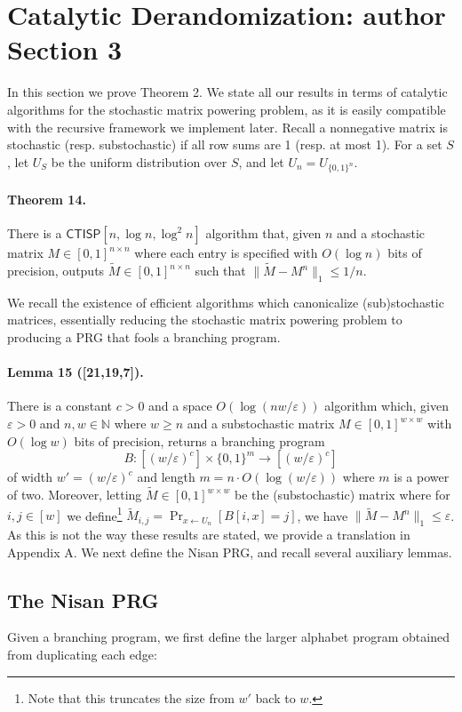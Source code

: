 \documentclass[10pt,a4paper]{article}
\begin{document}
\section*{Catalytic Derandomization: author Section 3}
In this section we prove Theorem 2. We state all our results in terms of catalytic algorithms for the stochastic matrix powering problem, as it is easily compatible with the recursive framework we implement later. Recall a nonnegative matrix is stochastic (resp. substochastic) if all row sums are 1 (resp. at most 1). For a set $S$, let $U_S$ be the uniform distribution over $S$, and let $U_n=U_{\{0,1\}^n}$.

\paragraph{Theorem 14.} There is a $\mathsf{CTISP}[n,\log n,\log^2 n]$ algorithm that, given $n$ and a stochastic matrix $M\in[0,1]^{n\times n}$ where each entry is specified with $O(\log n)$ bits of precision, outputs $\widetilde M\in[0,1]^{n\times n}$ such that $\|\widetilde M-M^n\|_1\leq1/n$.

We recall the existence of efficient algorithms which canonicalize (sub)stochastic matrices, essentially reducing the stochastic matrix powering problem to producing a PRG that fools a branching program.
\paragraph{Lemma 15 ([21,19,7]).} There is a constant $c>0$ and a space $O(\log(nw/\varepsilon))$ algorithm which, given $\varepsilon>0$ and $n,w\in\mathbb N$ where $w\geq n$ and a substochastic matrix $M\in[0,1]^{w\times w}$ with $O(\log w)$ bits of precision, returns a branching program
\[B:[(w/\varepsilon)^c]\times\{0,1\}^m\to[(w/\varepsilon)^c]\]
of width $w'=(w/\varepsilon)^c$ and length $m=n\cdot O(\log(w/\varepsilon))$ where $m$ is a power of two. Moreover, letting $\widetilde M\in[0,1]^{w\times w}$ be the (substochastic) matrix where for $i,j\in[w]$ we define\footnote{Note that this truncates the size from $w'$ back to $w$.} $\widetilde M_{i,j}=\Pr_{x\leftarrow U_n}[B[i,x]=j]$, we have $\|\widetilde M-M^n\|_1\leq\varepsilon$.
As this is not the way these results are stated, we provide a translation in Appendix A. We next define the Nisan PRG, and recall several auxiliary lemmas.
\subsection*{The Nisan PRG}
Given a branching program, we first define the larger alphabet program obtained from duplicating each edge:
\end{document}
